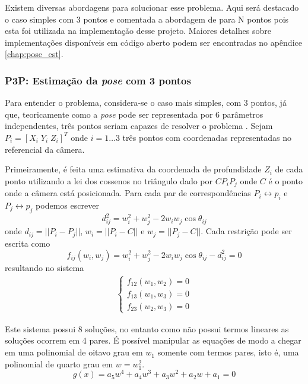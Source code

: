 Existem diversas abordagens para solucionar esse problema. Aqui será destacado o caso simples com 3 pontos e comentada a abordagem de \citep{dementhon1995model}  para N pontos pois esta foi utilizada na implementação desse projeto. Maiores detalhes sobre implementações disponíveis em código aberto podem ser encontradas no apêndice \ref{chap:pose_est}. 

\subsubsection{P3P: Estimação da \textit{pose} com 3 pontos}
Para entender o problema, considera-se o caso mais simples, com 3 pontos, já que, teoricamente como a \textit{pose} pode ser representada por 6 parâmetros independentes, três pontos seriam capazes de resolver o problema \citep{marchand2016pose}. Sejam ${P_i} = [X_i \; Y_i \; Z_i ]^T$ onde $i = 1 \dots 3$ três pontos com coordenadas representadas no referencial da câmera. 

Primeiramente, é feita uma estimativa da coordenada de profundidade $Z_i$ de cada ponto utilizando a lei dos cossenos no triângulo dado por ${C} {P}_i {P}_j$ onde ${C}$ é o ponto onde a câmera está posicionada. Para cada par de correspondências $P_i \leftrightarrow p_i$ e $P_j \leftrightarrow p_j$ podemos escrever \citep{quan1999linear} 
\begin{equation}
d_{ij}^2 = w_i^2 + w_j^2 -2 w_i w_j \cos \theta_{ij}
\end{equation}
onde $d_{ij} = ||{P}_i - {P}_j||$, $w_i = ||{P}_i - C||$ e $w_j = ||{P}_j - {C}||$. Cada restrição pode ser escrita como 
\begin{equation}
f_{ij}(w_i, w_j) = w_i^2 + w_j^2 - 2w_i w_j \cos \theta_{ij} - d_{ij}^2 = 0
\end{equation}
resultando no sistema
\begin{align*}
\begin{cases}
f_{12}(w_1, w_2) = 0 \\ 
f_{13}(w_1, w_3) = 0 \\ 
f_{23}(w_2, w_3) = 0
\end{cases}
\end{align*}

Este sistema possui 8 soluções, no entanto como não possui termos lineares as soluções ocorrem em 4 pares. É possível manipular as equações de modo a chegar em uma polinomial de oitavo grau em $w_1$ somente com termos pares, isto é, uma polinomial de quarto grau em $w = w_1^2$.
\begin{equation}
g(x) = a_5 w^4 + a_4 w^3 + a_3 w^2 + a_2 w + a_1 = 0
\end{equation}

